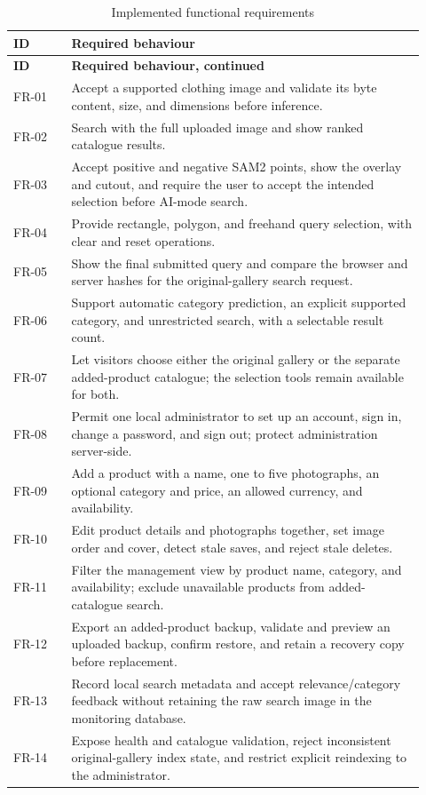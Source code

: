 \begin{ReportTable}
\begin{longtable}{@{}L{0.13\linewidth}L{0.79\linewidth}@{}}
\caption{Implemented functional requirements}\label{tab:functional-requirements}\\
\toprule\textbf{ID}&\textbf{Required behaviour}\\\midrule\endfirsthead
\toprule\textbf{ID}&\textbf{Required behaviour, continued}\\\midrule\endhead
FR-01 & Accept a supported clothing image and validate its byte content, size, and dimensions before inference.\\\addlinespace
FR-02 & Search with the full uploaded image and show ranked catalogue results.\\\addlinespace
FR-03 & Accept positive and negative SAM2 points, show the overlay and cutout, and require the user to accept the intended selection before AI-mode search.\\\addlinespace
FR-04 & Provide rectangle, polygon, and freehand query selection, with clear and reset operations.\\\addlinespace
FR-05 & Show the final submitted query and compare the browser and server hashes for the original-gallery search request.\\\addlinespace
FR-06 & Support automatic category prediction, an explicit supported category, and unrestricted search, with a selectable result count.\\\addlinespace
FR-07 & Let visitors choose either the original gallery or the separate added-product catalogue; the selection tools remain available for both.\\\addlinespace
FR-08 & Permit one local administrator to set up an account, sign in, change a password, and sign out; protect administration server-side.\\\addlinespace
FR-09 & Add a product with a name, one to five photographs, an optional category and price, an allowed currency, and availability.\\\addlinespace
FR-10 & Edit product details and photographs together, set image order and cover, detect stale saves, and reject stale deletes.\\\addlinespace
FR-11 & Filter the management view by product name, category, and availability; exclude unavailable products from added-catalogue search.\\\addlinespace
FR-12 & Export an added-product backup, validate and preview an uploaded backup, confirm restore, and retain a recovery copy before replacement.\\\addlinespace
FR-13 & Record local search metadata and accept relevance/category feedback without retaining the raw search image in the monitoring database.\\\addlinespace
FR-14 & Expose health and catalogue validation, reject inconsistent original-gallery index state, and restrict explicit reindexing to the administrator.\\
\bottomrule
\end{longtable}
\end{ReportTable}

